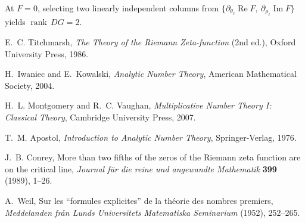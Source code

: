 \documentclass[11pt,a4paper]{article}
\theoremstyle{remark}
\DeclareMathOperator{\Re}{Re}
\DeclareMathOperator{\Im}{Im}
\DeclareMathOperator{\rank}{rank}
\begin{document}
At $F=0$, selecting two linearly independent columns from $\{\partial_{\theta_\ell}\Re F,\ \partial_{\rho_\ell}\Im F\}$ yields $\rank\,DG=2$.

\begin{thebibliography}{9}

E.~C. Titchmarsh, \emph{The Theory of the Riemann Zeta-function} (2nd ed.), Oxford University Press, 1986.

H.~Iwaniec and E.~Kowalski, \emph{Analytic Number Theory}, American Mathematical Society, 2004.

H.~L. Montgomery and R.~C. Vaughan, \emph{Multiplicative Number Theory I: Classical Theory}, Cambridge University Press, 2007.

T.~M. Apostol, \emph{Introduction to Analytic Number Theory}, Springer-Verlag, 1976.

J.~B. Conrey, More than two fifths of the zeros of the Riemann zeta function are on the critical line, \emph{Journal f\"ur die reine und angewandte Mathematik} \textbf{399} (1989), 1--26.

A.~Weil, Sur les ``formules explicites'' de la th\'eorie des nombres premiers, \emph{Meddelanden fr\aa n Lunds Universitets Matematiska Seminarium} (1952), 252--265.

\end{thebibliography}
\end{document}
